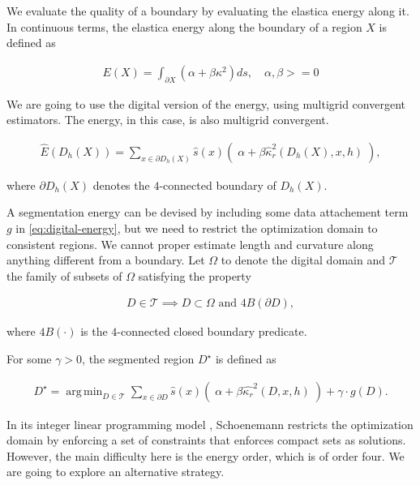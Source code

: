 \documentclass[runningheads]{llncs}
\DeclareMathOperator*{\argmin}{arg\,min}
\begin{document}
We evaluate the quality of a boundary by evaluating the elastica energy along it. In continuous terms, the elastica energy along the boundary of a region $X$ is defined as 

\begin{align*}
	E(X) = \int_{\partial X}{(\alpha + \beta \kappa^2) ds}, \quad \alpha,\beta >= 0
\end{align*}

We are going to use the digital version of the energy, using multigrid convergent estimators. The energy, in this case, is also multigrid convergent.

\begin{align}
	\hat{E}( D_h(X) ) = \sum_{x \in \partial D_h(X)}{ \hat{s}(x)\left(\; \alpha + \beta \hat{\kappa}_{r}^2(D_h(X),x,h) \; \right)}, 
	\label{eq:digital-energy}
\end{align}

where $\partial D_h(X)$ denotes the $4$-connected boundary of $D_h(X)$.

A segmentation energy can be devised by including some data attachement term $g$ in \eqref{eq:digital-energy}, but we need to restrict the optimization domain to consistent regions. We cannot proper estimate length and curvature along anything different from a boundary. Let $\Omega$ to denote the digital domain and $\mathcal{T}$ the family of subsets of $\Omega$ satisfying the property

\begin{align*}
	D \in \mathcal{T} \implies D \subset \Omega \text{ and } 4B(\partial D),
\end{align*} 

where $4B(\cdot)$ is the $4$-connected closed boundary predicate. 


For some $\gamma>0$, the segmented region $D^\star$ is defined as

\begin{align}
	D^{\star} = \argmin_{D \in \mathcal{T}}{\sum_{x \in \partial D}{ \hat{s}(x)\left(\; \alpha + \beta \hat{\kappa_{r}}^2(D,x,h) \; \right)} + \gamma \cdot g(D).}
	\label{eq:ideal_optimization_energy}
\end{align}

In its integer linear programming model \cite{schoenemann09}, Schoenemann restricts the optimization domain by enforcing a set of constraints that enforces compact sets as solutions. However, the main difficulty here is the energy order, which is of order four. We are going to explore an alternative strategy.
\end{document}
